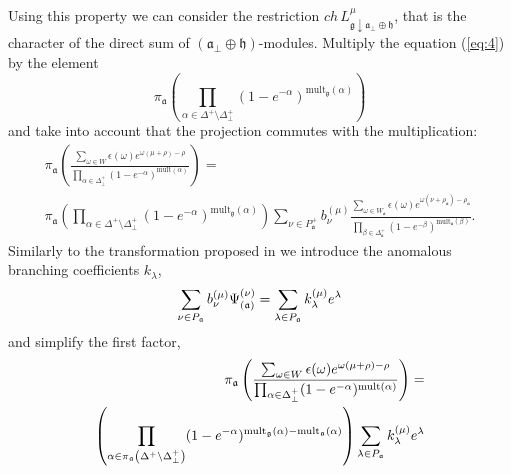 \documentclass[12pt]{iopart}
\begin{document}
Using this property we can consider the restriction $ch\, L^{\mu}_{\mathfrak{g}\downarrow \mathfrak{a}_{\bot}\oplus \mathfrak{h}}$, that is the character of the direct sum of $\left( \mathfrak{a}_{\bot}\oplus\mathfrak{h}\right) $-modules.
Multiply the equation (\ref{eq:4}) by the element
\begin{equation}
  \label{eq:5}
  \pi_{\mathfrak{a}}\left(\prod_{\alpha\in \Delta^{+}\setminus \Delta^{+}_{\bot}}(1-e^{-\alpha})^{\mathrm{mult}_{\mathfrak{g}}(\alpha)} \right)
\end{equation}
and take into account that the projection commutes with the multiplication:
\begin{eqnarray*}
  \label{eq:7}
  \pi_{\mathfrak{a}}\left(\frac{\sum_{\omega\in W} \epsilon(\omega) e^{\omega(\mu+\rho)-\rho}}{\prod_{\alpha\in\Delta^{+}_{\bot}}(1-e^{-\alpha})^{\mathrm{mult}(\alpha)}}\right) = \\
  \pi_{\mathfrak{a}}\left(\prod_{\alpha\in \Delta^{+}\setminus \Delta^{+}_{\bot}}(1-e^{-\alpha})^{\mathrm{mult}_{\mathfrak{g}}(\alpha)} \right)\sum_{\nu\in P^{+}_{\mathfrak{a}}}b^{(\mu)}_{\nu}
  \frac{\sum_{\omega\in W_{\mathfrak{a}}}\epsilon(\omega)e^{\omega(\nu+\rho_{\mathfrak{a}})-\rho_{\mathfrak{a}}}}{\prod_{\beta\in \Delta_{\mathfrak{a}}^{+}}(1-e^{-\beta})^{\mathrm{mult}_{\mathfrak{a}}(\beta)}}.
\end{eqnarray*}
Similarly to the transformation proposed in \cite{ilyin812pbc} we introduce the anomalous branching coefficients $k_{\lambda}$,
\begin{equation}
  \label{eq:10}
  \sum_{\nu \in P_{\frak{a}}}b_{\nu }^{\left( \mu \right) }\Psi _{\left( \frak{%
        a}\right) }^{\left( \nu \right) }=\sum_{\lambda \in P_{\frak{a}}}k_{\lambda
  }^{\left( \mu \right) }e^{\lambda }
\end{equation}
and simplify the first factor,
\begin{eqnarray*}
  \label{eq:12}
  \pi_{\mathfrak{a}}\left(\frac{\sum_{\omega\in W} \epsilon(\omega) e^{\omega(\mu+\rho)-\rho}}{\prod_{\alpha\in\Delta^{+}_{\bot}}(1-e^{-\alpha})^{\mathrm{mult}(\alpha)}}\right) = \\
  \left(\prod_{\alpha\in \pi_{\mathfrak{a}}\left(\Delta^{+}\setminus \Delta^{+}_{\bot}\right)}(1-e^{-\alpha})^{{\rm mult}_{\mathfrak{g}}(\alpha)-{\rm mult}_{\mathfrak{a}}(\alpha)} \right)
    \sum_{\lambda \in P_{\frak{a}}}k_{\lambda}^{\left( \mu \right) }e^{\lambda }
\end{eqnarray*}
\end{document}
